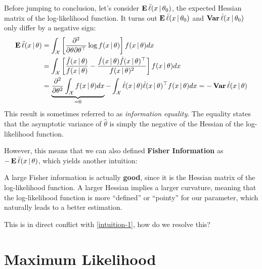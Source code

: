 \documentclass[a4paper]{article}
\begin{document}
Before jumping to conclusion,
let's consider $\operatorname{\text{\textrm{\upshape\textbf{E}}}}\ddot\ell(x\,|\,\theta_0)$,
the expected Hessian matrix of the log-likelihood function.
It turns out $\operatorname{\text{\textrm{\upshape\textbf{E}}}}\ddot\ell(x\,|\,\theta_0)$ and $\operatorname{\text{\textrm{\upshape\textbf{Var}}}}\dot\ell(x\,|\,\theta_0)$ only differ by a negative sign:
\begin{align*}
	\operatorname{\text{\textrm{\upshape\textbf{E}}}}\ddot\ell(x\,|\,\theta)
	&= \int_{\mathcal{X}} \left[ \frac{\partial^2}{\partial\theta\partial\theta^{\top}} \log f(x\,|\,\theta) \right] f(x\,|\,\theta) dx \\
	&= \int_{\mathcal{X}} \left[ \frac{\ddot f(x\,|\,\theta)}{f(x\,|\,\theta)} - \frac{\dot f(x\,|\,\theta)\dot f(x\,|\,\theta)^{\top}}{f(x\,|\,\theta)^2} \right] f(x\,|\,\theta) dx \\
	&= \underbrace{\frac{\partial^2}{\partial\theta^2} \int_{\mathcal{X}} f(x\,|\,\theta) dx}_{=0} - \int_{\mathcal{X}} \dot\ell(x\,|\,\theta)\dot\ell(x\,|\,\theta)^{\top} f(x\,|\,\theta) dx
	= -\operatorname{\text{\textrm{\upshape\textbf{Var}}}}\dot\ell(x\,|\,\theta)
\end{align*}
This result is sometimes referred to as \emph{information equality}.
The equality states that the asymptotic variance of $\hat\theta$ is simply the negative of the Hessian of the log-likelihood function.

However, this means that we can also defined \textbf{Fisher Information} as $-\operatorname{\text{\textrm{\upshape\textbf{E}}}}\ddot\ell(x\,|\,\theta)$,
which yields another intuition:

\begin{intuition}\label{intuition-2}
	A large Fisher information is actually \textbf{good},
	since it is the Hessian matrix of the log-likelihood function.
	A larger Hessian implies a larger curvature,
	meaning that the log-likelihood function is more ``defined'' or ``pointy'' for our parameter,
	which naturally leads to a better estimation.
\end{intuition}

This is in direct conflict with \autoref{intuition-1},
how do we resolve this?

\section{Maximum Likelihood}
\end{document}
